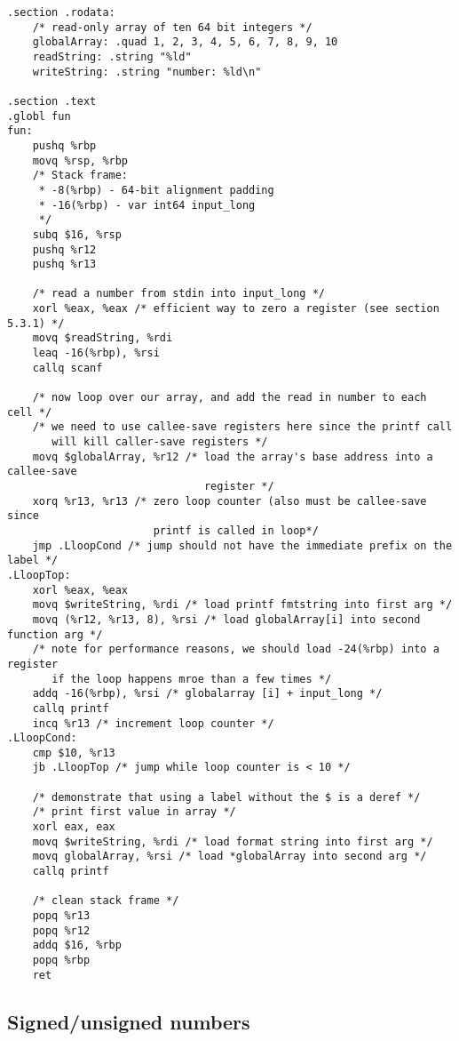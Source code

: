 \documentclass[11pt]{article}
\begin{document}
\begin{lstlisting}[caption={Labels and immediates}, captionpos=b]
.section .rodata:
    /* read-only array of ten 64 bit integers */
    globalArray: .quad 1, 2, 3, 4, 5, 6, 7, 8, 9, 10
    readString: .string "%ld"
    writeString: .string "number: %ld\n"

.section .text
.globl fun
fun:
    pushq %rbp
    movq %rsp, %rbp
    /* Stack frame:
     * -8(%rbp) - 64-bit alignment padding
     * -16(%rbp) - var int64 input_long
     */
    subq $16, %rsp
    pushq %r12
    pushq %r13

    /* read a number from stdin into input_long */
    xorl %eax, %eax /* efficient way to zero a register (see section 5.3.1) */
    movq $readString, %rdi
    leaq -16(%rbp), %rsi
    callq scanf

    /* now loop over our array, and add the read in number to each cell */
    /* we need to use callee-save registers here since the printf call
       will kill caller-save registers */
    movq $globalArray, %r12 /* load the array's base address into a callee-save
                               register */
    xorq %r13, %r13 /* zero loop counter (also must be callee-save since
                       printf is called in loop*/
    jmp .LloopCond /* jump should not have the immediate prefix on the label */
.LloopTop:
    xorl %eax, %eax
    movq $writeString, %rdi /* load printf fmtstring into first arg */
    movq (%r12, %r13, 8), %rsi /* load globalArray[i] into second function arg */
    /* note for performance reasons, we should load -24(%rbp) into a register
       if the loop happens mroe than a few times */
    addq -16(%rbp), %rsi /* globalarray [i] + input_long */
    callq printf
    incq %r13 /* increment loop counter */
.LloopCond:
    cmp $10, %r13
    jb .LloopTop /* jump while loop counter is < 10 */

    /* demonstrate that using a label without the $ is a deref */
    /* print first value in array */
    xorl eax, eax
    movq $writeString, %rdi /* load format string into first arg */
    movq globalArray, %rsi /* load *globalArray into second arg */
    callq printf

    /* clean stack frame */
    popq %r13
    popq %r12
    addq $16, %rbp
    popq %rbp
    ret
\end{lstlisting}

\subsection{Signed/unsigned numbers}
\end{document}

